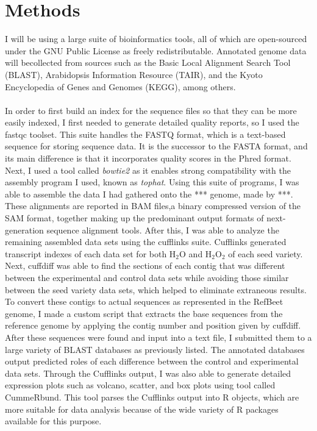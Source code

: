 \documentclass{article}
\begin{document}
\section{Methods}
	I will be using a large suite of bioinformatics tools, all of which are open-sourced under the GNU Public License as freely redistributable. Annotated genome data will becollected from sources such as the Basic Local Alignment Search Tool (BLAST), Arabidopsis Information Resource (TAIR), and the Kyoto Encyclopedia of Genes and Genomes (KEGG), among others.\\\\
	In order to first build an index for the sequence files so that they can be more easily indexed, I first needed to generate detailed quality reports, so I used the fastqc toolset. This suite handles the FASTQ format, which is a text-based sequence for storing sequence data. It is the successor to the FASTA format, and its main difference is that it incorporates quality scores in the Phred format. Next, I used a tool called \emph{bowtie2} as it enables strong compatibility with the assembly program I used, known as \emph{tophat}. Using this suite of programs, I was able to assemble the data I had gathered onto the *** genome, made by ***. These alignments are reported in BAM files,a binary compressed version of the SAM format, together making up the predominant output formats of next-generation sequence alignment tools. After this, I was able to analyze the remaining assembled data sets using the cufflinks suite. Cufflinks generated transcript indexes of each data set for both H$_{2}$O and H$_{2}$O$_{2}$ of each seed variety. Next, cuffdiff was able to find the sections of each contig that was different between the experimental and control data sets while avoiding those similar between the seed variety data sets, which helped to eliminate extraneous results. To convert these contigs to actual sequences as represented in the RefBeet genome, I made a custom script that extracts the base sequences from the reference genome by applying the contig number and position given by cuffdiff. After these sequences were found and input into a text file, I submitted them to a large variety of BLAST databases as previously listed. The annotated databases output predicted roles of each difference between the control and experimental data sets. Through the Cufflinks output, I was also able to generate detailed expression plots such as volcano, scatter, and box plots using tool called CummeRbund. This tool parses the Cufflinks output into R objects, which are more suitable for data analysis because of the wide variety of R packages available for this purpose.
\end{document}
